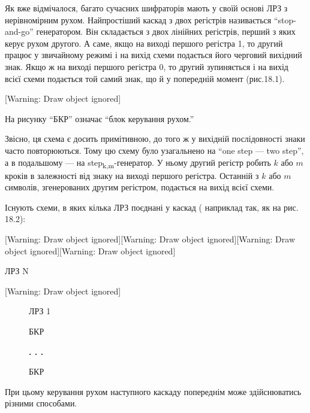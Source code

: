 Як вже відмічалося, багато сучасних шифраторів мають у своїй основі ЛРЗ з
нерівномірним рухом. Найпростіший каскад з двох регістрів називається
“stop{}-and{}-go” генератором. Він складається з двох лінійних регістрів,
перший з яких керує рухом другого. А саме, якщо на виході першого регістра 1,
то другий працює у звичайному режимі і на вихід схеми подається його черговий
вихідний знак. Якщо ж на виході першого регістра 0, то другий зупиняється і на
вихід всієї схеми  подається той самий знак, що й у попередній момент
(рис.18.1).

[Warning: Draw object ignored]

На рисунку “БКР” означає “блок керування рухом.”

Звісно, ця схема є досить примітивною, до того ж у вихідній послідовності знаки
часто повторюються. Тому цю схему було узагальнено на “one step --- two step”, а
в подальшому --- на 
step\textsubscript{k}\textsubscript{,}\textsubscript{m}{}-генератор. У ньому
другий регістр робить  $k$ або  $m$ кроків в залежності від знаку на виході
першого регістра. Останній з  $k$ або  $m$ символів, згенерованих другим
регістром, подається на вихід всієї схеми.

Існують схеми, в яких кілька ЛРЗ поєднані у каскад ( наприклад так, як на рис.
18.2):


\bigskip

[Warning: Draw object ignored][Warning: Draw object ignored][Warning: Draw
object ignored][Warning: Draw object ignored]\begin{minipage}{1.0098in}

\bigskip
\end{minipage}\begin{minipage}{1.0091in}
 ЛРЗ N
\end{minipage}[Warning: Draw object ignored]

\begin{figure}
\centering
\begin{minipage}{1.0098in}
 ЛРЗ 1
\end{minipage}
\end{figure}
\begin{figure}
\centering
\begin{minipage}{0.5299in}
БКР
\end{minipage}
\end{figure}
\begin{figure}
\centering
\begin{minipage}{0.5083in}
{\bfseries
. . .}
\end{minipage}
\end{figure}
\begin{figure}
\centering
\begin{minipage}{0.5299in}
БКР
\end{minipage}
\end{figure}
При цьому керування рухом наступного каскаду попереднім може здійснюватись
різними способами. 

